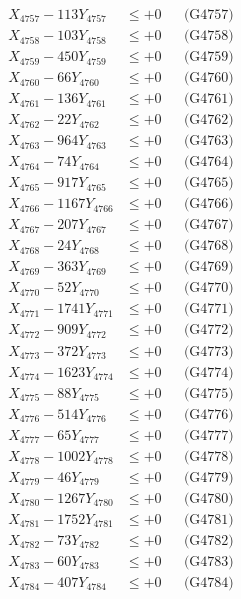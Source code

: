 \documentclass[a4paper,10pt]{article}
\begin{document}
{\begin{align}
X_{4757} - 113Y_{4757} &\leq +0 && \text{(G4757)} \\
X_{4758} - 103Y_{4758} &\leq +0 && \text{(G4758)} \\
X_{4759} - 450Y_{4759} &\leq +0 && \text{(G4759)} \\
X_{4760} - 66Y_{4760} &\leq +0 && \text{(G4760)} \\
\allowbreak
X_{4761} - 136Y_{4761} &\leq +0 && \text{(G4761)} \\
X_{4762} - 22Y_{4762} &\leq +0 && \text{(G4762)} \\
X_{4763} - 964Y_{4763} &\leq +0 && \text{(G4763)} \\
X_{4764} - 74Y_{4764} &\leq +0 && \text{(G4764)} \\
X_{4765} - 917Y_{4765} &\leq +0 && \text{(G4765)} \\
X_{4766} - 1167Y_{4766} &\leq +0 && \text{(G4766)} \\
X_{4767} - 207Y_{4767} &\leq +0 && \text{(G4767)} \\
X_{4768} - 24Y_{4768} &\leq +0 && \text{(G4768)} \\
X_{4769} - 363Y_{4769} &\leq +0 && \text{(G4769)} \\
X_{4770} - 52Y_{4770} &\leq +0 && \text{(G4770)} \\
\allowbreak
X_{4771} - 1741Y_{4771} &\leq +0 && \text{(G4771)} \\
X_{4772} - 909Y_{4772} &\leq +0 && \text{(G4772)} \\
X_{4773} - 372Y_{4773} &\leq +0 && \text{(G4773)} \\
X_{4774} - 1623Y_{4774} &\leq +0 && \text{(G4774)} \\
X_{4775} - 88Y_{4775} &\leq +0 && \text{(G4775)} \\
X_{4776} - 514Y_{4776} &\leq +0 && \text{(G4776)} \\
X_{4777} - 65Y_{4777} &\leq +0 && \text{(G4777)} \\
X_{4778} - 1002Y_{4778} &\leq +0 && \text{(G4778)} \\
X_{4779} - 46Y_{4779} &\leq +0 && \text{(G4779)} \\
X_{4780} - 1267Y_{4780} &\leq +0 && \text{(G4780)} \\
\allowbreak
X_{4781} - 1752Y_{4781} &\leq +0 && \text{(G4781)} \\
X_{4782} - 73Y_{4782} &\leq +0 && \text{(G4782)} \\
X_{4783} - 60Y_{4783} &\leq +0 && \text{(G4783)} \\
X_{4784} - 407Y_{4784} &\leq +0 && \text{(G4784)} \\

\end{align}}
\end{document}
